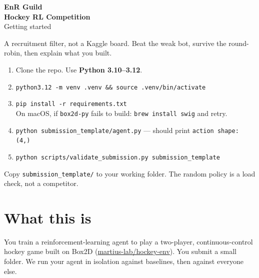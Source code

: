 \documentclass[11pt,a4paper]{article}
\begin{document}
\thispagestyle{empty}

\noindent
{}

\vspace*{-6mm}
{\sffamily\color{white}
{\Large\bfseries EnR Guild}\\[0.15em]
{\LARGE\bfseries Hockey RL Competition}\\[0.35em]
{\large Getting started}
\par}
\vspace{3mm}
{\sffamily\small\color{navy} A recruitment filter, not a Kaggle board. Beat the weak bot, survive the round-robin, then explain what you built.\par}

\vspace{2mm}

\begin{callout}
\begin{enumerate}[leftmargin=1.4em,itemsep=0.15em]
  \item Clone the repo. Use \textbf{Python 3.10--3.12}.
  \item \texttt{python3.12 -m venv .venv \&\& source .venv/bin/activate}
  \item \texttt{pip install -r requirements.txt}\\
        On macOS, if \texttt{box2d-py} fails to build: \texttt{brew install swig} and retry.
  \item \texttt{python submission\_template/agent.py} --- should print \texttt{action shape: (4,)}
  \item \texttt{python scripts/validate\_submission.py submission\_template}
\end{enumerate}
Copy \texttt{submission\_template/} to your working folder. The random policy is a load check, not a competitor.
\end{callout}

\section{What this is}

You train a reinforcement-learning agent to play a two-player, continuous-control hockey game built on Box2D (\href{https://github.com/martius-lab/hockey-env}{martius-lab/hockey-env}). You submit a small folder. We run your agent in isolation against baselines, then against everyone else.
\end{document}
